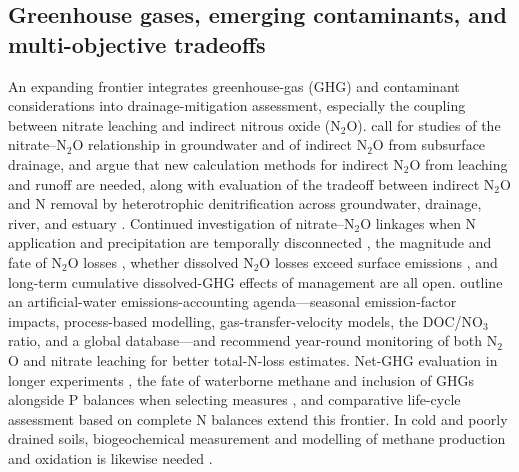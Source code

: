 \subsection{Greenhouse gases, emerging contaminants, and multi-objective tradeoffs}

An expanding frontier integrates greenhouse-gas (GHG) and contaminant considerations into drainage-mitigation assessment, especially the coupling between nitrate leaching and indirect nitrous oxide (N$_2$O). \textcite{Sawamoto2003} call for studies of the nitrate--N$_2$O relationship in groundwater and of indirect N$_2$O from subsurface drainage, and \textcite{Minamikawa2015} argue that new calculation methods for indirect N$_2$O from leaching and runoff are needed, along with evaluation of the tradeoff between indirect N$_2$O and N removal by heterotrophic denitrification across groundwater, drainage, river, and estuary \parencite{Minamikawa2013,Minamikawa2010}. Continued investigation of nitrate--N$_2$O linkages when N application and precipitation are temporally disconnected \parencite{OBrien2022}, the magnitude and fate of N$_2$O losses \parencite{Burton2024}, whether dissolved N$_2$O losses exceed surface emissions \parencite{Smith2019}, and long-term cumulative dissolved-GHG effects of management \parencite{Oliveira2025} are all open. \textcite{Webb2021} outline an artificial-water emissions-accounting agenda---seasonal emission-factor impacts, process-based modelling, gas-transfer-velocity models, the DOC/NO$_3$ ratio, and a global database---and \textcite{Fontes2019} recommend year-round monitoring of both N$_2$O and nitrate leaching for better total-N-loss estimates. Net-GHG evaluation in longer experiments \parencite{PrezaFontes2023}, the fate of waterborne methane and inclusion of GHGs alongside P balances when selecting measures \parencite{Carstensen2021}, and comparative life-cycle assessment based on complete N balances \parencite{HernandezRamirez2011} extend this frontier. In cold and poorly drained soils, biogeochemical measurement and modelling of methane production and oxidation is likewise needed \parencite{Kumar2014b}.

